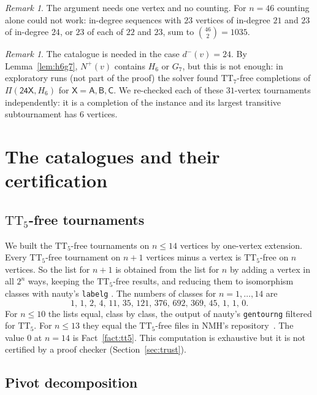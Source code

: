 \documentclass[11pt]{amsart}
\theoremstyle{definition}
\theoremstyle{remark}
\newtheorem{remark}[theorem]{Remark}
\newcommand{\TT}[1]{\mathrm{TT}_{#1}}
\newcommand{\cl}[1]{\textsf{#1}}
\newcommand{\Piv}[2]{\Pi(#1,#2)}
\newcommand{\Np}{N^{+}}
\newcommand{\dmi}{d^{-}}
\begin{document}
\begin{remark}
The argument needs one vertex and no counting. For $n=46$ counting alone could
not work: in-degree sequences with $23$ vertices of in-degree $21$ and $23$ of
in-degree $24$, or $23$ of each of $22$ and $23$, sum to
$\binom{46}{2}=1035$.
\end{remark}

\begin{remark}\label{rem:h6sat}
The catalogue is needed in the case $\dmi(v)=24$. By Lemma~\ref{lem:h6g7},
$\Np(v)$ contains $H_6$ or $G_7$, but this is not enough: in exploratory runs
(not part of the proof) the solver found $\TT{7}$-free completions of
$\Piv{\cl{24X}}{H_6}$ for $\cl{X}=\cl{A},\cl{B},\cl{C}$. We re-checked each of
these $31$-vertex tournaments independently: it is a completion of the
instance and its largest transitive subtournament has $6$ vertices.
\end{remark}

\section{The catalogues and their certification}\label{sec:catalogue}

\subsection{$\TT{5}$-free tournaments}\label{sec:tt5}
We built the $\TT{5}$-free tournaments on $n \le 14$ vertices by one-vertex
extension. Every $\TT{5}$-free tournament on $n+1$ vertices minus a vertex is
$\TT{5}$-free on $n$ vertices. So the list for $n+1$ is obtained from the list
for $n$ by adding a vertex in all $2^n$ ways, keeping the $\TT{5}$-free
results, and reducing them to isomorphism classes with nauty's \texttt{labelg}
\cite{MP14}. The numbers of classes for $n=1,\dots,14$ are
\[
1,\,1,\,2,\,4,\,11,\,35,\,121,\,376,\,692,\,369,\,45,\,1,\,1,\,0 .
\]
For $n \le 10$ the lists equal, class by class, the output of nauty's
\texttt{gentourng} filtered for $\TT{5}$. For $n \le 13$ they equal the
$\TT{5}$-free files in NMH's repository~\cite{NMHrepo}. The value $0$ at
$n=14$ is Fact~\ref{fact:tt5}. This computation is exhaustive but it is not
certified by a proof checker (Section~\ref{sec:trust}).

\subsection{Pivot decomposition}
\end{document}
